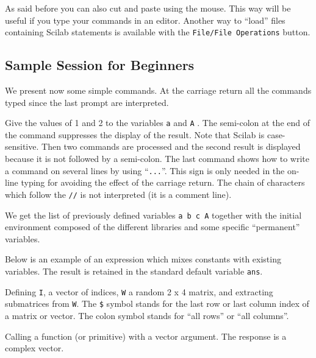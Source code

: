 As said before you can also cut and paste using the mouse. This way will be
useful if you type your commands in an editor. Another way to 
``load'' files containing Scilab statements
is available with the {\tt File/File Operations} button.

\subsection{Sample Session for Beginners}

We present now some simple commands. At the carriage return all the 
commands typed since the last prompt are interpreted. 

\noindent\dotfill



Give the values of 1 and 2 to the variables {\tt a} and { \tt A} .  The 
semi-colon at the end of the command suppresses the display of the result.
Note that Scilab is case-sensitive.
Then two commands are processed and the second result is displayed because
it is not followed by a semi-colon. The last command shows how to write a
command on several lines by using ``{\tt ...}''. This sign is only needed
in the on-line typing for avoiding the effect of the carriage return.
 The chain of characters which follow the {\tt //} is not interpreted 
(it is a comment line).

\noindent\dotfill



We get the list of previously defined variables {\tt a b c A}  together
with the initial environment composed of the different libraries and
some specific ``permanent'' variables.

Below is an example of an expression which mixes constants with existing
variables.  The result is retained in the standard default variable 
{\tt ans}.

\noindent\dotfill



Defining {\tt I}, a vector of indices, {\tt W} a random 2 x 4 matrix,
and extracting submatrices from {\tt W}. The \verb!$! symbol stands
for the last row or last column index of a matrix or vector. The colon
symbol stands for ``all rows'' or ``all columns''.

\noindent\dotfill



Calling a function (or primitive) with a vector argument.  The response
is a complex vector.

